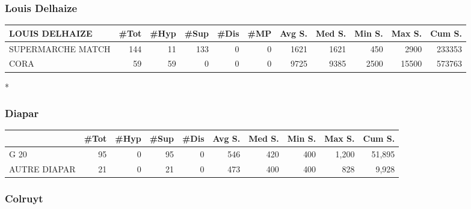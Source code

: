 \documentclass[11pt]{article}
\begin{document}
\subsubsection{Louis Delhaize}

\begin{table}[H]
\footnotesize
\setlength{\tabcolsep}{2pt}

\begin{tabular}{lrrrrrrrrrr}
\toprule
LOUIS DELHAIZE &       \#Tot &       \#Hyp &       \#Sup &       \#Dis &        \#MP &     Avg S. &     Med S. &     Min S. &     Max S. &     Cum S. \\
\midrule
SUPERMARCHE MATCH &        144 &         11 &        133 &          0 &          0 &       1621 &       1621 &        450 &       2900 &     233353 \\
CORA              &         59 &         59 &          0 &          0 &          0 &       9725 &       9385 &       2500 &      15500 &     573763 \\
\bottomrule
\end{tabular}*
\end{table}


\subsubsection{Diapar}

\begin{table}[H]
\footnotesize
\setlength{\tabcolsep}{2pt}

\begin{tabular}{lrrrrrrrrr}
\toprule
{} &       \#Tot &       \#Hyp &       \#Sup &       \#Dis &     Avg S. &     Med S. &     Min S. &     Max S. &     Cum S. \\
\midrule
G 20         &         95 &          0 &         95 &          0 &        546 &        420 &        400 &      1,200 &     51,895 \\
AUTRE DIAPAR &         21 &          0 &         21 &          0 &        473 &        400 &        400 &        828 &      9,928 \\
\bottomrule
\end{tabular}

\end{table}


\subsubsection{Colruyt}
\end{document}
